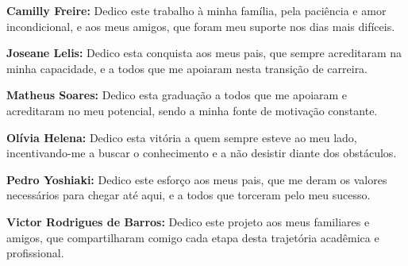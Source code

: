 \begin{dedicatoria}
    \vspace*{\fill}
    \begin{flushright}
        \textbf{Camilly Freire:} Dedico este trabalho à minha família, pela paciência e amor incondicional, e aos meus amigos, que foram meu suporte nos dias mais difíceis.

        \vspace{0.5cm}
        \textbf{Joseane Lelis:} Dedico esta conquista aos meus pais, que sempre acreditaram na minha capacidade, e a todos que me apoiaram nesta transição de carreira.

        \vspace{0.5cm}
        \textbf{Matheus Soares:} Dedico esta graduação a todos que me apoiaram e acreditaram no meu potencial, sendo a minha fonte de motivação constante.

        \vspace{0.5cm}
        \textbf{Olívia Helena:} Dedico esta vitória a quem sempre esteve ao meu lado, incentivando-me a buscar o conhecimento e a não desistir diante dos obstáculos.

        \vspace{0.5cm}
        \textbf{Pedro Yoshiaki:} Dedico este esforço aos meus pais, que me deram os valores necessários para chegar até aqui, e a todos que torceram pelo meu sucesso.

        \vspace{0.5cm}
        \textbf{Victor Rodrigues de Barros:} Dedico este projeto aos meus familiares e amigos, que compartilharam comigo cada etapa desta trajetória acadêmica e profissional.
    \end{flushright}
\end{dedicatoria}
